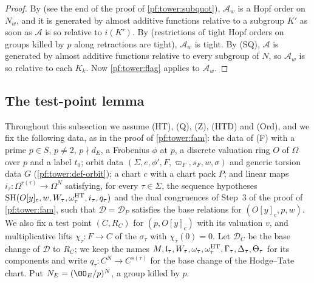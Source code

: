 \begin{proof}
By  (see the end of the proof of \cref{pf:tower:subquot}),
$\mathcal A_w$ is a Hopf order on $N_w$, and it is generated by almost additive functions relative to a subgroup $K'$ as soon
as $\mathcal A$ is so relative to $i(K')$. By  (restrictions of tight
Hopf orders on groups killed by $p$ along retractions are tight), $\mathcal A_w$ is tight. By (SQ), $\mathcal A$ is generated
by almost additive functions relative to every subgroup of $N$, so $\mathcal A_w$ is so relative to each $K_k$. Now
\cref{pf:tower:flag} applies to $\mathcal A_w$.
\end{proof}

\subsection{The test-point lemma}\label{pf:tower:sec-test}

Throughout this subsection we assume (HT), (Q), (Z), (HTD) and (Ord), and we fix the following data, as in the proof of
\cref{pf:tower:fam}: the data of (F) with a prime $p\in S$, $p\ne2$, $p\nmid d_E$, a Frobenius $\phi$ at $p$, a discrete
valuation ring $O$ of $\Omega$ over $p$ and a label $t_0$; orbit data $(\Sigma,e,\phi',F,\varpi_F,s_F,w,\sigma)$ and generic
torsion data $G$ (\cref{pf:tower:def-orbit}); a chart $c$ with a chart pack $P$; and linear maps
$i_\tau\colon\Omega^{r(\tau)}\to\Omega^N$ satisfying, for every $\tau\in\Sigma$, the sequence hypotheses
$\mathrm{SH}(O[y]_c,w,W_\tau,\omega^{\mathrm{HT}}_\tau,i_\tau,q_\tau)$ and the dual congruences of Step~3 of the proof of
\cref{pf:tower:fam}, such that $\mathcal D=\mathcal D_P$ satisfies the base relations for $(O[y]_c,p,w)$. We also fix a test
point $(C,R_C)$ for $(p,O[y]_c)$ with its valuation $v$, and multiplicative lifts $\chi_\tau\colon F\to C$ of the
$\sigma_\tau$ with $\chi_\tau(0)=0$. Let $\mathcal D_C$ be the base change of $\mathcal D$ to $R_C$; we keep the names
$M,\mathfrak l_\tau,W_\tau,\omega_\tau,\omega^{\mathrm{HT}}_\tau,\Gamma_\tau,\Delta_\tau,\Theta_\tau$ for its components and write
$q_\tau\colon C^N\to C^{s(\tau)}$ for the base change of the Hodge--Tate chart. Put $N_E=(\OO_E/p)^N$, a group killed by $p$.

